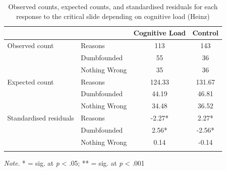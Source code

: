 \documentclass[
  man,floatsintext]{apa6}
\begin{document}
\begin{table}[tbp]

\begin{center}
\begin{threeparttable}

\caption{\label{tab:tabS6tab1dumbHeinz}Observed counts, expected counts, and standardised residuals for each response to the critical slide depending on cognitive load (Heinz)}

\begin{tabular}{llcc}
\toprule
 & \multicolumn{1}{c}{} & \multicolumn{1}{c}{Cognitive Load} & \multicolumn{1}{c}{Control}\\
\midrule
Observed count & Reasons & 113 & 143\\
 & Dumbfounded & 55 & 36\\
 & Nothing Wrong & 35 & 36\\
Expected count & Reasons & 124.33 & 131.67\\
 & Dumbfounded & 44.19 & 46.81\\
 & Nothing Wrong & 34.48 & 36.52\\
Standardised residuals & Reasons & -2.27* & 2.27*\\
 & Dumbfounded & 2.56* & -2.56*\\
 & Nothing Wrong & 0.14 & -0.14\\
\bottomrule
\addlinespace
\end{tabular}

\begin{tablenotes}[para]
\normalsize{\textit{Note.} * = sig. at \emph{p} < .05; ** = sig. at \emph{p} < .001}
\end{tablenotes}

\end{threeparttable}
\end{center}

\end{table}
\end{document}
